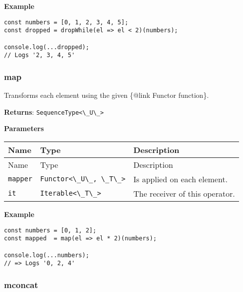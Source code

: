 \textbf{Example}

\begin{lstlisting}[label=6eda0eb3-c4be-4257-85f9-929d969986a0]
const numbers = [0, 1, 2, 3, 4, 5];
const dropped = dropWhile(el => el < 2)(numbers);
                                                 
console.log(...dropped);
// Logs '2, 3, 4, 5'
\end{lstlisting}

\hypertarget{c353a5b1-74a9-4860-8859-5cb1db0001ed}{%
\subsubsection{map}\label{c353a5b1-74a9-4860-8859-5cb1db0001ed}}

Transforms each element using the given \{@link Functor function\}.

\textbf{Returns}: \passthrough{\lstinline!SequenceType<\_U\_>!}

\textbf{Parameters}

\begin{longtable}[]{
  >{\raggedright\arraybackslash}p{}
  >{\raggedright\arraybackslash}p{}
  >{\raggedright\arraybackslash}p{}@{}}

\toprule\noalign{}
Name & Type & Description \\
\midrule\noalign{}
\endfirsthead
\toprule\noalign{}
Name & Type & Description \\
\midrule\noalign{}
\endhead
\bottomrule\noalign{}
\endlastfoot
\passthrough{\lstinline!mapper!} &
\passthrough{\lstinline!Functor<\_U\_, \_T\_>!} & Is applied on each
element. \\
\passthrough{\lstinline!it!} & \passthrough{\lstinline!Iterable<\_T\_>!}
& The receiver of this operator. \\
\end{longtable}

\textbf{Example}

\begin{lstlisting}[label=84de7cd1-052e-4191-b5df-e13e9aa8c128]
const numbers = [0, 1, 2];
const mapped  = map(el => el * 2)(numbers);
                                           
console.log(...numbers);
// => Logs '0, 2, 4'
\end{lstlisting}

\hypertarget{3dce9274-3bb4-45df-95d1-5e63e59c508b}{%
\subsubsection{mconcat}\label{3dce9274-3bb4-45df-95d1-5e63e59c508b}}

